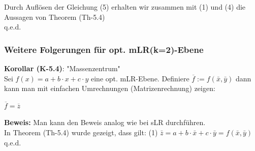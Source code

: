 \documentclass[12pt]{article}
\begin{document}
%
Durch Auflösen der Gleichung (5) erhalten wir zusammen mit (1) und (4) die Aussagen von Theorem (Th-5.4)\\
q.e.d.\\[0.4cm]

\subsubsection{Weitere Folgerungen für opt. mLR(k=2)-Ebene} 
%
\textbf{Korollar (K-5.4)}: "Massenzentrum" \\
Sei $ f(x) =  a + b \cdot x + c \cdot y $ eine opt. mLR-Ebene. Definiere $\overline{f} := f(\bar{x},\bar{y})$ dann kann man mit einfachen Umrechnungen (Matrizenrechnung) zeigen: 
\begin{large}
\begin{center}
$ \overline{f} = \overline{z} $ \\
\end{center} 
\end{large}
\textbf{Beweis:} Man kann den Beweis analog wie bei sLR durchführen.\\
In Theorem (Th-5.4) wurde gezeigt, dass gilt: (1) $ \bar{z} = a + b \cdot  \bar{x} +  c  \cdot \bar{y} = f(\bar{x},\bar{y}) $  \\[0.2cm] 
q.e.d.\\[0.2cm] 
%
{\color{red}{***************************** Weitere analoge Aussagen wie bei sLR-Geraden formulieren (i.e. "SST = SSE + SSR?" etc. ... *********************************}}\\[0.2cm] 
%
\end{document}
